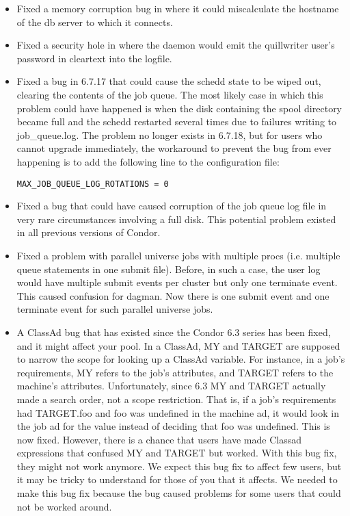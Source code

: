 \begin{itemize}

\item Fixed a memory corruption bug in  where it could
miscalculate the hostname of the db server to which it connects.

\item Fixed a security hole in  where the daemon would
emit the quillwriter user's password in cleartext into the 
logfile.

\item Fixed a bug in 6.7.17 that could cause the schedd state to be
wiped out, clearing the contents of the job queue.  The most likely
case in which this problem could have happened is when the disk
containing the spool directory became full and the schedd restarted
several times due to failures writing to job\_queue.log.  The problem
no longer exists in 6.7.18, but for users who cannot upgrade
immediately, the workaround to prevent the bug from ever happening is
to add the following line to the configuration file:

\begin{verbatim}
MAX_JOB_QUEUE_LOG_ROTATIONS = 0
\end{verbatim}

\item Fixed a bug that could have caused corruption of the job queue
log file in very rare circumstances involving a full disk.  This
potential problem existed in all previous versions of Condor.

\item Fixed a problem with parallel universe jobs with multiple
procs (i.e. multiple queue statements in one submit file).
Before, in such a case, the user log would have multiple
submit events per cluster but only one terminate event.  This caused
confusion for dagman.  Now there is one submit event and one terminate
event for such parallel universe jobs.

\item A ClassAd bug that has existed since the Condor 6.3 series has
been fixed, and it might affect your pool. In a ClassAd, MY and TARGET
are supposed to narrow the scope for looking up a ClassAd
variable. For instance, in a job's requirements, MY refers to the
job's attributes, and TARGET refers to the machine's
attributes. Unfortunately, since 6.3 MY and TARGET actually made a
search order, not a scope restriction. That is, if a job's requirements
had TARGET.foo and foo was undefined in the machine ad, it would look
in the job ad for the value instead of deciding that foo was
undefined. This is now fixed. However, there is a chance that users
have made Classad expressions that confused MY and TARGET but
worked. With this bug fix, they might not work anymore. We expect this
bug fix to affect few users, but it may be tricky to understand for
those of you that it affects. We needed to make this bug fix because
the bug caused problems for some users that could not be worked
around.


\end{itemize}

